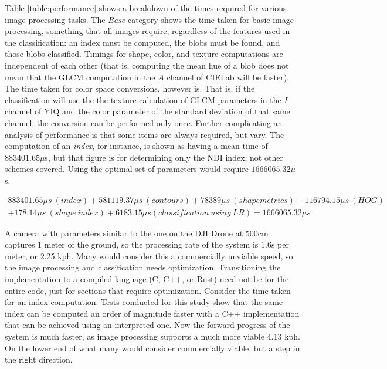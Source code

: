 \documentclass[letterpaper]{report}
\begin{document}
Table \ref{table:performance} shows a breakdown of the times required for various image processing tasks. The \textit{Base} category shows the time taken for basic image processing, something that all images require, regardless of the features used in the classification: an index must be computed, the blobs must be found, and those blobs classified. Timings for shape, color, and texture computations are independent of each other (that is, computing the mean hue of a blob does not mean that the GLCM computation in the $A$ channel of CIELab will be faster). The time taken for color space conversions, however is. That is, if the classification will use the the texture calculation of GLCM parameters in the $I$ channel of YIQ and the color parameter of the standard deviation of that same channel, the conversion can be performed only once. Further complicating an analysis of performance is that some items are always required, but vary. The computation of an \textit{index}, for instance, is shown as having a mean time of $883401.65 \mu$s, but that figure is for determining only the NDI index, not other schemes covered. Using the optimal set of parameters would require $1666065.32 \mu$s. 

\begin{multline}
883401.65 \mu s\ (index) + 581119.37 \mu s\  (contours) + 78389 \mu s\ (shape metrics) + 116794.15 \mu s\ (HOG) \\ + 178.14 \mu s\ (shape\ index) + 6183.15 \mu s (classification\ using\ LR) = 1666065.32 \mu s
\end{multline}

A camera with parameters similar to the one on the DJI Drone at 500cm captures 1 meter of the ground, so the processing rate of the system is 1.6s per meter, or 2.25 kph. Many would consider this a commercially unviable speed, so the image processing and classification needs optimization. Transitioning the implementation to a compiled language (C, C++, or Rust) need not be for the entire code, just for sections that require optimization. Consider the time taken for an index computation. Tests conducted for this study show that the same index can be computed an order of magnitude faster with a C++ implementation that can be achieved using an interpreted one. Now the forward progress of the system is much faster, as image processing supports a much more viable 4.13 kph. On the lower end of what many would consider commercially viable, but a step in the right direction.
\end{document}
